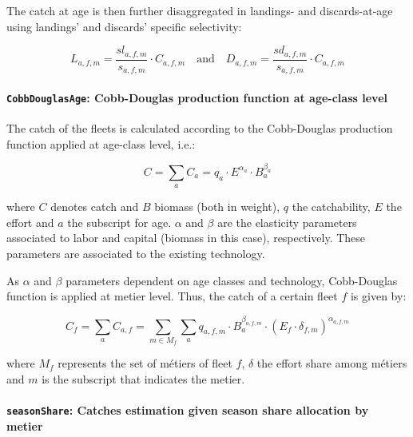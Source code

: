 	The catch at age is then further disaggregated in landings- and discards-at-age using landings' and discards' specific selectivity:
		
	\begin{equation}  \label{eq:land_disc}
		L_{a,f,m} = \frac{sl_{a,f,m}}{s_{a,f,m}}\cdot C_{a,f,m} \quad  \text{and} \quad  D_{a,f,m} = \frac{sd_{a,f,m}}{s_{a,f,m}}\cdot C_{a,f,m}
	\end{equation}

 	
 	\paragraph{\texttt{CobbDouglasAge}: Cobb-Douglas production function at age-class level} \hspace{0pt} \smallskip

 	 	The  catch of the fleets is calculated according to the Cobb-Douglas production function 
		applied at age-class level, i.e.:
		
\begin{equation}  \label{eq:Cobb_Doug_age}
	C = \sum_a C_a = q_a\cdot E^{\alpha_a} \cdot B_a^{\beta_a}
\end{equation}

	\noindent where $C$ denotes catch and $B$  biomass (both in weight), $q$ the catchability, $E$ the effort
	and $a$ the subscript for age. $\alpha$ and $\beta$ are the elasticity parameters associated to labor and capital 
	(biomass in this case), respectively. These parameters are associated
	to the existing technology. 

	As $\alpha$ and $\beta$ parameters dependent on age classes and technology, Cobb-Douglas function is
	applied at metier level. Thus, the catch of a certain fleet $f$ is given by:

\begin{equation}  \label{eq:Cobb_Doug_fleet_age}
	C_f = \sum_a C_{a,f} = \sum_{m \in M_f} \sum_a q_{a,f,m}\cdot B_a^{\beta _{a,f,m}} \cdot (E_f\cdot \delta_{f,m})^{\alpha_{a,f,m}}
\end{equation}
 
	\noindent where $M_f$ represents the set of m\'etiers of fleet $f$, $\delta$ the effort share among m\'etiers and $m$ 
	is the subscript that indicates the metier.

 	\paragraph{\texttt{seasonShare}: Catches estimation given season share allocation by metier} \hspace{0pt} \smallskip

